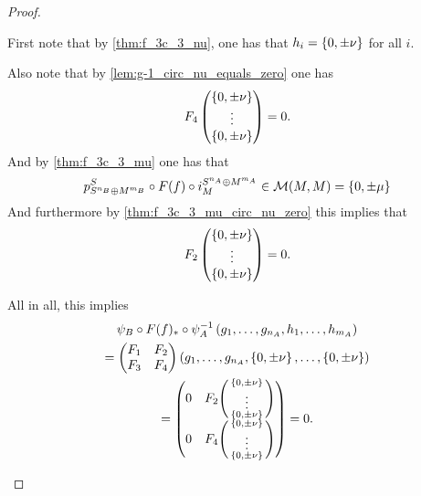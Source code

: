 \begin{proof}
\begin{enumerate}
{            First note that by \autoref{thm:f_3c_3_nu}, one has that \( h_i = \left\{ 0, \pm \nu \right\} \) for all \( i \).

            Also note that by \autoref{lem:g-1_circ_nu_equals_zero} one has
            \[
                F_4 \begin{pmatrix}
                    \left\{ 0, \pm \nu \right\} \\
                    \vdots \\
                    \left\{ 0, \pm \nu \right\}
                \end{pmatrix} = 0.
            \]
            And by \autoref{thm:f_3c_3_mu} one has that
            \[
                p_{S^{n_B} \oplus M^{m_B}}^S \circ F(f) \circ i_M^{S^{n_A} \oplus M^{m_A}} \in {\mathcal{M}}(M, M) = \left\{ 0, \pm \mu \right\}
            \]
            And furthermore by \autoref{thm:f_3c_3_mu_circ_nu_zero} this implies that
            \[
                F_2 \begin{pmatrix}
                    \left\{ 0, \pm \nu \right\} \\
                    \vdots \\
                    \left\{ 0, \pm \nu \right\}
                \end{pmatrix} = 0.
            \]

            All in all, this implies
            \begin{multline*}
                \psi_B \circ F(f)_* \circ \psi_A^{-1} \left( g_1, \dots, g_{n_A}, h_1, \dots, h_{m_A} \right) \\
                = \begin{pmatrix}
                    F_1 & F_2 \\
                    F_3 & F_4
                \end{pmatrix} \left( g_1, \dots, g_{n_A}, \left\{ 0, \pm \nu \right\}, \dots, \left\{ 0, \pm \nu \right\} \right) \\
                = \begin{pmatrix}
                    0 & F_2 \begin{psmallmatrix}
                        \left\{ 0, \pm \nu \right\} \\
                        \vdots \\
                        \left\{ 0, \pm \nu \right\}
                    \end{psmallmatrix} \\
                    0 & F_4 \begin{psmallmatrix}
                        \left\{ 0, \pm \nu \right\} \\
                        \vdots \\
                        \left\{ 0, \pm \nu \right\}
                    \end{psmallmatrix} \\
                \end{pmatrix} 
                = 0.
            \end{multline*}

}
\end{enumerate}
\end{proof}

